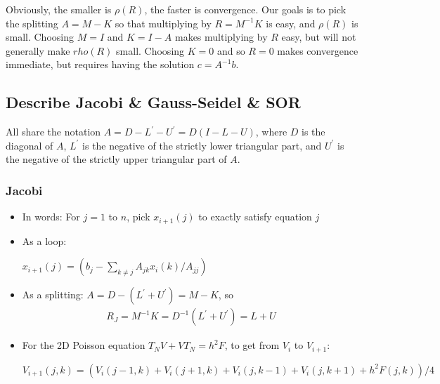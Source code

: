 \documentclass[11pt]{article}
\numberwithin{equation}{section}
\begin{document}
Obviously, the smaller is $\rho(R)$, the faster is convergence. Our goals is to pick the splitting $A = M-K$ so that multiplying by $R = M^{-1}K$ is easy, 
and $\rho(R)$ is small. Choosing $M = I$ and $K = I-A$ makes multiplying by $R$ easy, but will not generally make $rho(R)$ small. 
Choosing $K = 0$ and so $R = 0$ makes convergence immediate, but requires having the solution $c = A^{-1}b$.

\subsection{Describe Jacobi \& Gauss-Seidel \& SOR}
All share the notation $A = D - L^\prime - U^\prime = D(I - L - U)$, where $D$ is the diagonal of $A$, $L^\prime$ is the negative of the strictly lower triangular part, 
and $U^\prime$ is the negative of the strictly upper triangular part of $A$.

\subsubsection{Jacobi}
\begin{itemize}
    \item In words: For $j=1$ to $n$, pick $x_{i+1}(j)$ to exactly satisfy equation $j$
    \item As a loop:
    \begin{algorithmfrm}
        \begin{algorithmic}[1]
            \State $x_{i+1}(j)=\left( b_j - \sum_{k \neq j} A_{jk}x_i(k) / A_{jj} \right)$
            \EndFor
        \end{algorithmic}
    \end{algorithmfrm}
    \item As a splitting: $A = D - (L^\prime+U^\prime) = M - K$, so 
    \begin{align*}
        R_J = M^{-1}K = D^{-1}(L^\prime+U^\prime) = L+U    
    \end{align*}
    \item For the 2D Poisson equation $T_N V+V T_N = h^2 F$, to get from $V_i$ to $V_{i+1}$:
    \begin{algorithmfrm}
        \begin{algorithmic}[1]
            \State $V_{i+1}(j,k) = (V_i(j-1,k) + V_i(j+1,k) + V_i(j,k-1) + V_i(j,k+1) + h^2 F(j,k))/4$ 
            \EndFor
            \EndFor
        \end{algorithmic}
    \end{algorithmfrm}
\end{itemize}
\end{document}
